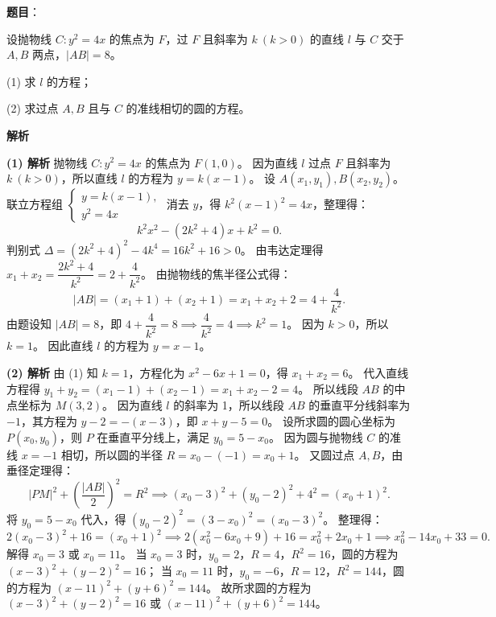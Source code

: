\begin{answer}

\textbf{题目}：

设抛物线 $C: y^2=4x$ 的焦点为 $F$，过 $F$ 且斜率为 $k\ (k>0)$ 的直线 $l$ 与 $C$ 交于 $A,B$ 两点，$|AB|=8$。

(1) 求 $l$ 的方程；

(2) 求过点 $A,B$ 且与 $C$ 的准线相切的圆的方程。

\textbf{解析}

\textbf{(1) 解析} 抛物线 $C: y^2=4x$ 的焦点为 $F(1,0)$。
因为直线 $l$ 过点 $F$ 且斜率为 $k\ (k>0)$，所以直线 $l$ 的方程为 $y=k(x-1)$。
设 $A(x_1,y_1), B(x_2,y_2)$。
联立方程组 $\begin{cases}y=k(x-1),\\ y^2=4x\end{cases}$ 消去 $y$，得 $k^2(x-1)^2 = 4x$，整理得：
\nopagebreak[4]
\[k^2 x^2 - (2k^2+4)x + k^2 = 0.\]
判别式 $\Delta = (2k^2+4)^2 - 4k^4 = 16k^2+16 > 0$。
由韦达定理得 $x_1+x_2 = \dfrac{2k^2+4}{k^2} = 2 + \dfrac{4}{k^2}$。
由抛物线的焦半径公式得：
\nopagebreak[4]
\[|AB| = (x_1+1) + (x_2+1) = x_1+x_2+2 = 4 + \dfrac{4}{k^2}.\]
由题设知 $|AB|=8$，即 $4+\dfrac{4}{k^2}=8 \implies \dfrac{4}{k^2}=4 \implies k^2=1$。
因为 $k>0$，所以 $k=1$。
因此直线 $l$ 的方程为 $y=x-1$。

\textbf{(2) 解析} 由 (1) 知 $k=1$，方程化为 $x^2-6x+1=0$，得 $x_1+x_2=6$。
代入直线方程得 $y_1+y_2 = (x_1-1)+(x_2-1) = x_1+x_2-2 = 4$。
所以线段 $AB$ 的中点坐标为 $M(3,2)$。
因为直线 $l$ 的斜率为 1，所以线段 $AB$ 的垂直平分线斜率为 $-1$，其方程为 $y-2 = -(x-3)$，即 $x+y-5=0$。
设所求圆的圆心坐标为 $P(x_0,y_0)$，则 $P$ 在垂直平分线上，满足 $y_0 = 5-x_0$。
因为圆与抛物线 $C$ 的准线 $x=-1$ 相切，所以圆的半径 $R = x_0-(-1) = x_0+1$。
又圆过点 $A,B$，由垂径定理得：
\nopagebreak[4]
\[|PM|^2 + \left(\dfrac{|AB|}{2}\right)^2 = R^2 \implies (x_0-3)^2 + (y_0-2)^2 + 4^2 = (x_0+1)^2.\]
将 $y_0 = 5-x_0$ 代入，得 $(y_0-2)^2 = (3-x_0)^2 = (x_0-3)^2$。
整理得：
\nopagebreak[4]
\[2(x_0-3)^2 + 16 = (x_0+1)^2 \implies 2(x_0^2-6x_0+9)+16 = x_0^2+2x_0+1 \implies x_0^2-14x_0+33 = 0.\]
解得 $x_0=3$ 或 $x_0=11$。
当 $x_0=3$ 时，$y_0=2$，$R=4$，$R^2=16$，圆的方程为 $(x-3)^2+(y-2)^2=16$；
当 $x_0=11$ 时，$y_0=-6$，$R=12$，$R^2=144$，圆的方程为 $(x-11)^2+(y+6)^2=144$。
故所求圆的方程为 $(x-3)^2+(y-2)^2=16$ 或 $(x-11)^2+(y+6)^2=144$。



\end{answer}
